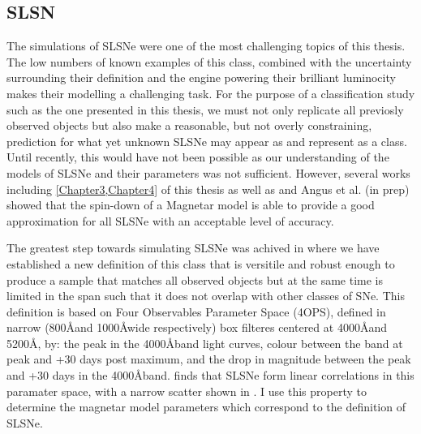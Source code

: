 \subsection{SLSN}
The simulations of SLSNe were one of the most challenging topics of this thesis. The low numbers of known examples of this class, combined with the uncertainty surrounding their definition and the engine powering their brilliant luminocity makes their modelling a challenging task. For the purpose of a classification study such as the one presented in this thesis, we must not only replicate all previosly observed objects but also make a reasonable, but not overly constraining, prediction for what yet unknown SLSNe may appear as and represent as a class. Until recently, this would have not been possible as our understanding of the models of SLSNe and their parameters was not sufficient. However, several works including \cref{Chapter3,Chapter4} of this thesis as well as \citet{Inserra2013,Nicoll2013,Nicoll2017} and Angus et al. (in prep) showed that the spin-down of a Magnetar model is able to provide a good approximation for all SLSNe with an acceptable level of accuracy.

The greatest step towards simulating SLSNe was achived in \citet{Inserra2018a} where we have established a new definition of this class that is versitile and robust enough to produce a sample that matches all observed objects but at the same time is limited in the span such that it does not overlap with other classes of SNe. This definition is based on Four Observables Parameter Space (4OPS), defined in narrow (800\AA and 1000\AA wide respectively) box filteres centered at 4000\AA and 5200\AA, by: the peak in the 4000\AA band light curves, colour between the band at peak and +30 days post maximum, and the drop in magnitude between the peak and +30 days in the 4000\AA band. \citet{Inserra2018a} finds that SLSNe form linear correlations in this paramater space, with a narrow scatter shown in . I use this property to determine the magnetar model parameters which correspond to the definition of SLSNe.

\begin{figure}
  \caption{}
  \label{fig:4OPS}
\end{figure}


